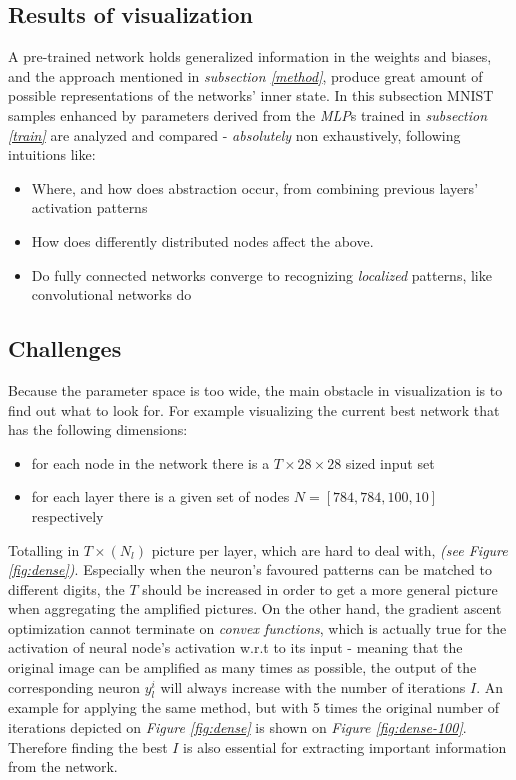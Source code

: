 \subsection{Results of visualization}

A pre-trained network holds generalized information in the weights and biases, and the approach mentioned in \emph{subsection \ref{method}}, produce great amount of possible representations of the networks' inner state. In this subsection MNIST samples enhanced by parameters derived from the \emph{MLP}s trained in \emph{subsection \ref{train}} are analyzed and compared - \textit{absolutely} non exhaustively, following intuitions like:

\begin{itemize}
    \item Where, and how does abstraction occur, from combining previous layers' activation patterns
    \item How does differently distributed nodes affect the above.
    \item Do fully connected networks converge to recognizing \emph{localized} patterns, like convolutional networks do
\end{itemize}

\subsection{Challenges} Because the parameter space is too wide, the main obstacle in visualization is to find out what to look for. For example visualizing the current best network that has the following dimensions: 
\begin{itemize}
    \item for each node in the network there is a $T \times 28 \times 28$ sized input set
    \item for each layer there is a given set of nodes $N = [784, 784, 100, 10]$ respectively
\end{itemize}

Totalling in $T\times(N_l)$ picture per layer, which are hard to deal with, \emph{(see Figure \ref{fig:dense})}. 
Especially when the neuron's favoured patterns can be matched to different digits, 
the $T$ should be increased in order to get a more general picture when aggregating the amplified pictures.
On the other hand, the gradient ascent optimization cannot terminate on \emph{convex functions}, which is actually true for the activation of neural node's activation w.r.t to its input - meaning that the original image can be amplified as many times as possible, the output of the corresponding neuron $y_l^i$ will always increase with the number of iterations $I$. An example for applying the same method, but with 5 times the original number of iterations depicted on \emph{Figure \ref{fig:dense}} is shown on \emph{Figure \ref{fig:dense-100}}.
Therefore finding the best $I$ is also essential for extracting important information from the network.


